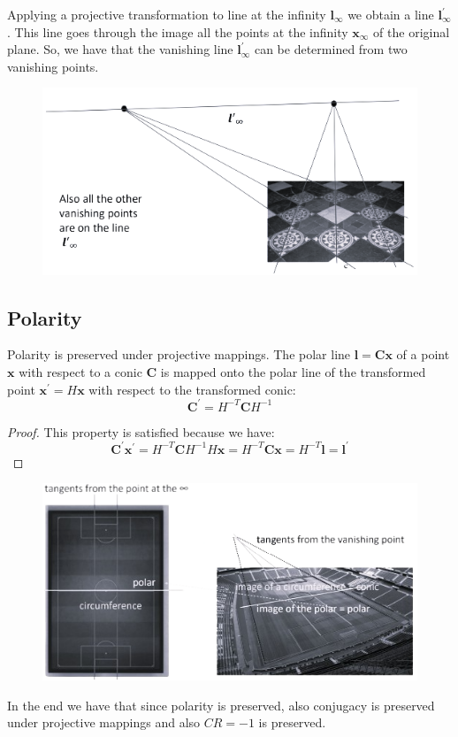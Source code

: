 \documentclass[12pt, a4paper]{report}
\newtheorem[style=M,bodystyle=\normalfont]{theorem}{Theorem}
\newtheorem[style=M,bodystyle=\normalfont]{corollary}{Corollary}
\newtheorem[style=M,bodystyle=\normalfont]{lemma}{Lemma}
\newtheorem[style=M,bodystyle=\normalfont]{definition}{Definition}
\begin{document}
    Applying a projective transformation to line at the infinity $\boldsymbol{l}_{\infty}$ we obtain a line $\boldsymbol{l}_{\infty}^{'}$. This line goes through the image all the points at 
    the infinity $\boldsymbol{x}_{\infty}$ of the original plane. So, we have that the vanishing line $\boldsymbol{l}_{\infty}^{'}$ can be determined from two vanishing points. 
    \begin{figure}[H]
        \centering
        \includegraphics[width=0.75\linewidth]{images/vanishingline.png}
    \end{figure}

    \subsection{Polarity}
    Polarity is preserved under projective mappings. The polar line $\boldsymbol{l}=\boldsymbol{Cx}$ of a point $\boldsymbol{x}$ with respect to a conic $\boldsymbol{C}$ is mapped onto the polar line 
    of the transformed point $\boldsymbol{x}^{'}=H\boldsymbol{x}$ with respect to the transformed conic: 
    \[\boldsymbol{C}^{'}=H^{-T}\boldsymbol{C}H^{-1}\]
    \begin{proof}
        This property is satisfied because we have: 
        \[\boldsymbol{C}^{'}\boldsymbol{x}^{'}=H^{-T}\boldsymbol{C}H^{-1}H\boldsymbol{x}=H^{-T}\boldsymbol{Cx}=H^{-T}\boldsymbol{l}=\boldsymbol{l}^{'}\]
    \end{proof}
    \begin{figure}[H]
        \centering
        \includegraphics[width=0.75\linewidth]{images/polarity.png}
    \end{figure}
    In the end we have that since polarity is preserved, also conjugacy is preserved under projective mappings and also $CR=-1$ is preserved.
\end{document}
